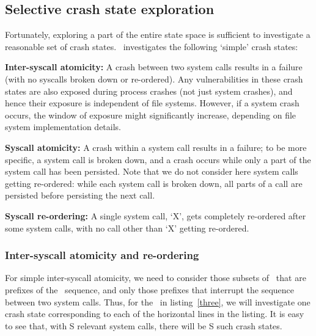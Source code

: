 \subsection{Selective crash state exploration}
\label{selective}
Fortunately, exploring a part of the entire state space is sufficient to investigate a reasonable set of crash states. \Kassandra\ investigates	 the following `simple' crash states:

\noindent\textbf{Inter-syscall atomicity:} A crash between two system calls results in a failure (with no syscalls broken down or re-ordered). Any vulnerabilities in these crash states are also exposed during process crashes (not just system crashes), and hence their exposure is independent of file systems. However, if a system crash occurs, the window of exposure might significantly increase, depending on file system implementation details.

\noindent\textbf{Syscall atomicity:} A crash within a system call results in a failure; to be more specific, a system call is broken down, and a crash occurs while only a part of the system call has been persisted. Note that we do not consider here system calls getting re-ordered: while each system call is broken down, all parts of a call are persisted before persisting the next call.

\noindent\textbf{Syscall re-ordering:} A single system call, `X', gets completely re-ordered after some system calls, with no call other than `X' getting re-ordered.



\subsubsection{Inter-syscall atomicity and re-ordering}

For simple inter-syscall atomicity, we need to consider those subsets of \microinstructions\ that are prefixes of the \microinstruction\ sequence, and only those prefixes that interrupt the sequence between two system calls. Thus, for the \microprogram\ in listing~\ref{three}, we will investigate one crash state corresponding to each of the horizontal lines in the listing. It is easy to see that, with S relevant system calls, there will be S such crash states.

